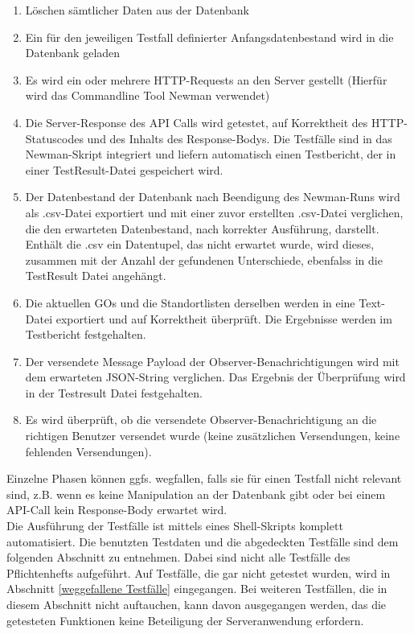 \documentclass[11pt,a4paper]{scrartcl}
\begin{document}
\begin{enumerate}
	\item Löschen sämtlicher Daten aus der Datenbank
	\item Ein für den jeweiligen Testfall definierter Anfangsdatenbestand wird in die Datenbank geladen
	\item Es wird ein oder mehrere HTTP-Requests an den Server gestellt (Hierfür wird das Commandline Tool Newman verwendet)
	\item Die Server-Response des API Calls wird getestet, auf Korrektheit des HTTP-Statuscodes und des Inhalts des Response-Bodys. Die Testfälle sind in das Newman-Skript integriert und liefern automatisch einen Testbericht, der in einer TestResult-Datei gespeichert wird.
	\item Der Datenbestand der Datenbank nach Beendigung des Newman-Runs wird als .csv-Datei exportiert und mit einer zuvor erstellten .csv-Datei verglichen, die den erwarteten Datenbestand, nach korrekter Ausführung, darstellt. Enthält die .csv ein Datentupel, das nicht erwartet wurde,  wird dieses, zusammen mit der Anzahl der gefundenen Unterschiede, ebenfalss in die TestResult Datei angehängt.
	\item Die aktuellen GOs und die Standortlisten derselben werden in eine Text-Datei exportiert und auf Korrektheit überprüft. Die Ergebnisse werden im Testbericht festgehalten.
	\item Der versendete Message Payload der Observer-Benachrichtigungen wird mit dem erwarteten JSON-String verglichen. Das Ergebnis der Überprüfung wird in der Testresult Datei festgehalten.
	\item Es wird überprüft, ob die versendete Observer-Benachrichtigung an die richtigen Benutzer versendet wurde (keine zusätzlichen Versendungen, keine fehlenden Versendungen).
\end{enumerate}
Einzelne Phasen können ggfs. wegfallen, falls sie für einen Testfall nicht relevant sind, z.B. wenn es keine Manipulation an der Datenbank gibt oder bei einem API-Call kein Response-Body erwartet wird.\\

Die Ausführung der Testfälle ist mittels eines Shell-Skripts komplett automatisiert. Die benutzten Testdaten und die abgedeckten Testfälle sind dem folgenden Abschnitt zu entnehmen. Dabei sind nicht alle Testfälle des Pflichtenhefts aufgeführt. Auf Testfälle, die gar nicht getestet wurden, wird in Abschnitt \ref{weggefallene Testfälle} eingegangen. Bei weiteren Testfällen, die in diesem Abschnitt nicht auftauchen, kann davon ausgegangen werden, das die getesteten Funktionen keine Beteiligung der Serveranwendung erfordern.\\
\end{document}

